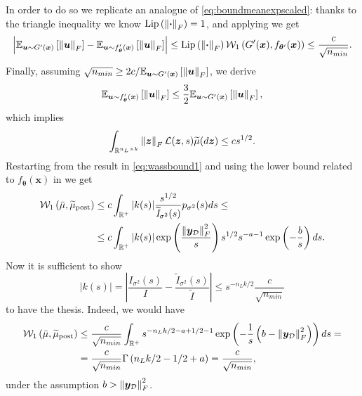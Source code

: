 In order to do so we replicate an analogue of \cref{eq:boundmeanexpscaled}: thanks to the triangle inequality we know $\lipschitz{\norm{\bm{\cdot}}_F} = 1$, and applying  we get
\begin{equation*}
	\left|\mean[\bm{u} \sim G'(\bm{x})]{\norm{\bm{u}}_F} - \mean[\bm{u} \sim f_{\bm{\theta}}'(\bm{x})]{\norm{\bm{u}}_F}\right| \leq \lipschitz{\norm{\bm{\cdot}}_F} \wass[1]{G'(\bm{x})}{f_{\bm{\theta}'}(\bm{x})} \leq \frac{c}{\sqrt{n_{min}}}.
\end{equation*}
Finally, assuming $\sqrt{n_{min}} \geq 2 c / \mean[\bm{u} \sim G'(\bm{x})]{\norm{\bm{u}}_F}$, we derive
\begin{equation*}
	\mean[\bm{u} \sim f_{\bm{\theta}}'(\bm{x})]{\norm{\bm{u}}_F} \leq \frac{3}{2} \mean[\bm{u} \sim G'(\bm{x})]{\norm{\bm{u}}_F},
\end{equation*}
which implies 
\begin{equation*}
	\int_{\real^{n_L \times k}} \norm{\bm{z}}_F \mathcal{L}(\bm{z}, s) \widetilde{\mu}(d\bm{z}) \leq c s^{1/2}.
\end{equation*}
Restarting from the result in \cref{eq:wassbound1} and using the lower bound related to $f_{\bm{\theta}}(\bm{x})$ in  we get
\begin{align*}
	\wass[1]{\bar{\mu}}{\widetilde{\mu}_{\mathrm{post}}} & \leq c \int_{\real^+} |k(s)| \frac{s^{1/2}}{\widetilde{\mathit{I}}_{\sigma^2}(s)} p_{\sigma^2}(s) ds \leq \\
	& \leq c \int_{\real^+} |k(s)| \exp{\frac{\norm{\bm{y}_{\mathcal{D}}}_F^2}{s}} s^{1/2} s^{-a - 1} \exp{-\frac{b}{s}} ds. 
\end{align*}
Now it is sufficient to show 
\begin{equation} \label{eq:boundks}
	|k(s)| = \left|\frac{\mathit{I}_{\sigma^2}(s)}{\mathit{I}} - \frac{\widetilde{\mathit{I}}_{\sigma^2}(s)}{\widetilde{\mathit{I}}}\right| \leq s^{-n_L k / 2} \frac{c}{\sqrt{n_{min}}}
\end{equation}
to have the thesis. Indeed, we would have
\begin{align*}
	\wass[1]{\bar{\mu}}{\widetilde{\mu}_{\mathrm{post}}} & \leq \frac{c}{\sqrt{n_{min}}} \int_{\real^+} s^{-n_L k / 2 - a + 1/2 - 1} \exp{-\frac{1}{s} \left(b - \norm{\bm{y}_{\mathcal{D}}}_F^2\right)} ds = \nonumber \\
	& = \frac{c}{\sqrt{n_{min}}} \Gamma\left(n_L k / 2 - 1/2 + a\right) = \frac{c}{\sqrt{n_{min}}}, 
\end{align*}
under the assumption $b > \norm{\bm{y}_{\mathcal{D}}}_F^2$. \\
